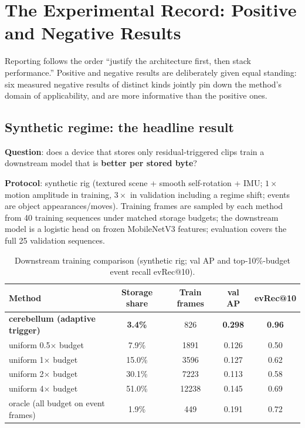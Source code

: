 \documentclass[12pt,a4paper]{article}
\begin{document}
\section{The Experimental Record: Positive and Negative Results}
\label{sec:experiments}

Reporting follows the order ``justify the architecture first, then stack performance.'' Positive and negative results are deliberately given equal standing: six measured negative results of distinct kinds jointly pin down the method's domain of applicability, and are more informative than the positive ones.

\subsection{Synthetic regime: the headline result}

\textbf{Question}: does a device that stores only residual-triggered clips train a downstream model that is \textbf{better per stored byte}?

\textbf{Protocol}: synthetic rig (textured scene + smooth self-rotation + IMU; $1\times$ motion amplitude in training, $3\times$ in validation including a regime shift; events are object appearances/moves). Training frames are sampled by each method from 40 training sequences under matched storage budgets; the downstream model is a logistic head on frozen MobileNetV3 features; evaluation covers the full 25 validation sequences.

\begin{table}[htbp]
  \centering
  \small
  \caption{Downstream training comparison (synthetic rig; val AP and top-10\%-budget event recall evRec@10).}
  \label{tab:headline}
  \begin{tabular}{lcccc}
    \toprule
    Method & Storage share & Train frames & val AP & evRec@10 \\
    \midrule
    \textbf{cerebellum (adaptive trigger)} & \textbf{3.4\%} & 826 & \textbf{0.298} & \textbf{0.96} \\
    uniform 0.5$\times$ budget & 7.9\% & 1891 & 0.126 & 0.50 \\
    uniform 1$\times$ budget & 15.0\% & 3596 & 0.127 & 0.62 \\
    uniform 2$\times$ budget & 30.1\% & 7223 & 0.113 & 0.58 \\
    uniform 4$\times$ budget & 51.0\% & 12238 & 0.145 & 0.69 \\
    oracle (all budget on event frames) & 1.9\% & 449 & 0.191 & 0.72 \\
    \bottomrule
  \end{tabular}
\end{table}
\end{document}
